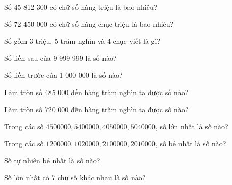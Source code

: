 \begin{ex}
Số 45 812 300 có chữ số hàng triệu là bao nhiêu?
\end{ex}

\begin{ex}
Số 72 450 000 có chữ số hàng chục triệu là bao nhiêu?
\end{ex}

\begin{ex}
Số gồm 3 triệu, 5 trăm nghìn và 4 chục viết là gì?
\end{ex}

\begin{ex}
Số liền sau của 9 999 999 là số nào?
\end{ex}

\begin{ex}
Số liền trước của 1 000 000 là số nào?
\end{ex}

\begin{ex}
Làm tròn số 485 000 đến hàng trăm nghìn ta được số nào?
\end{ex}

\begin{ex}
Làm tròn số 720 000 đến hàng trăm nghìn ta được số nào?
\end{ex}

\begin{ex}
Trong các số $4500000, 5400000, 4050000, 5040000$, số lớn nhất là số nào?
\end{ex}

\begin{ex}
Trong các số $1200000, 1020000, 2100000, 2010000$, số bé nhất là số nào?
\end{ex}

\begin{ex}
Số tự nhiên bé nhất là số nào?
\end{ex}

\begin{ex}
Số lớn nhất có 7 chữ số khác nhau là số nào?
\end{ex}

